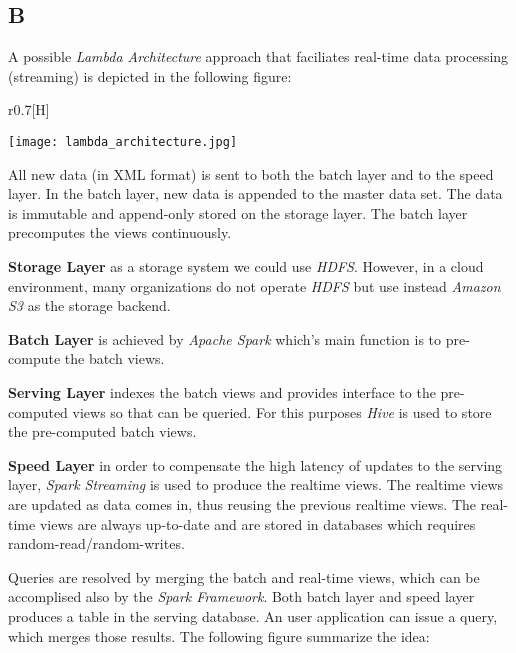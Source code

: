\documentclass[format=acmsmall, review=false, screen=true]{acmart}
\begin{document}
\subsection{B}

A possible \textit{Lambda Architecture} approach that faciliates real-time data processing (streaming) is depicted in the following figure:

\begin{wrapfigure}{r}{0.7\textwidth}[H]
\begin{center}
  \texttt{[image: lambda\_architecture.jpg]}
  \caption{A possible \textit{Lambda Architecture} approach that faciliates real-time data processing (streaming)}
  \label{fig:lambda-architecture}
\end{center}
\end{wrapfigure}

\newpage

All new data (in XML format) is sent to both the batch layer and to the speed layer. In the batch layer, new data is appended to the master data set. The data is immutable and append-only stored on the storage layer. The batch layer precomputes the views continuously.

\textbf{Storage Layer} as a storage system we could use \textit{HDFS}. However, in a cloud environment, many organizations do not operate \textit{HDFS} but use instead \textit{Amazon S3} as the storage backend. 

\textbf{Batch Layer} is achieved by \textit{Apache Spark} which's main function is to pre-compute the batch views.

\textbf{Serving Layer} indexes the batch views and provides interface to the pre-computed views so that can be queried. For this purposes \textit{Hive} is used to store the pre-computed batch views.

\textbf{Speed Layer} in order to compensate the high latency of updates to the serving layer, \textit{Spark Streaming} is used to produce the realtime views. The realtime views are updated as data comes in, thus reusing the previous realtime views. The real-time views are always up-to-date and are stored in databases which requires random-read/random-writes.

Queries are resolved by merging the batch and real-time views, which can be accomplised also by the \textit{Spark Framework}. Both batch layer and speed layer produces a table in the serving database. An user application can issue a query, which merges those results. The following figure summarize the idea:
\end{document}
